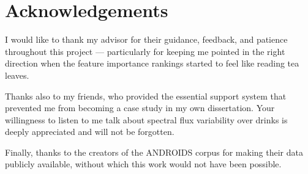 \documentclass{l4proj}
\begin{document}
\chapter*{Acknowledgements}
I would like to thank my advisor for their guidance, feedback, and patience throughout this project --- particularly for keeping me pointed in the right direction when the feature importance rankings started to feel like reading tea leaves.

Thanks also to my friends, who provided the essential support system that prevented me from becoming a case study in my own dissertation. Your willingness to listen to me talk about spectral flux variability over drinks is deeply appreciated and will not be forgotten.

Finally, thanks to the creators of the ANDROIDS corpus for making their data publicly available, without which this work would not have been possible.

\def\consentname {Nile}
\def\consentdate {March 2026}

\educationalconsent

\tableofcontents






\end{document}

